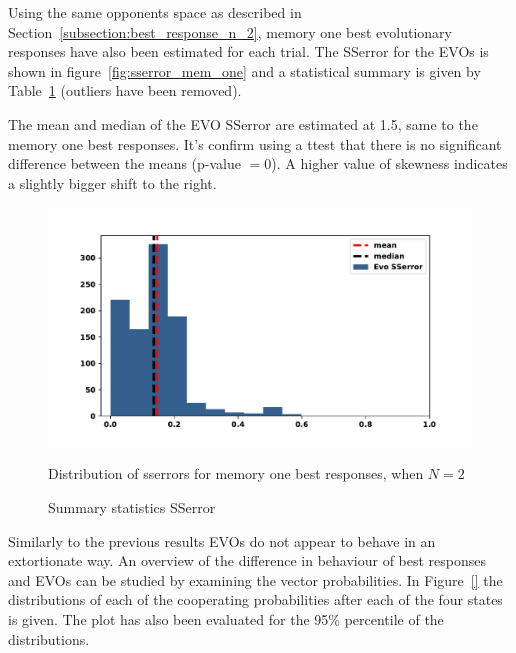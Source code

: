 \documentclass[10pt]{article}
\begin{document}
Using the same opponents space as described in Section~\ref{subsection:best_response_n_2},
memory one best evolutionary responses have also been estimated for each trial.
The SSerror for the EVOs is shown in figure~\ref{fig:sserror_mem_one} and
a statistical summary is given by Table~\ref{table:sserror_stats} (outliers have been
removed).

The mean and median of the EVO SSerror are estimated at 1.5, same to the memory
one best responses. It's confirm using a t\-test that there is no significant
difference between the means (p-value \(=0\)). A higher value of skewness
indicates a slightly bigger shift to the right.

\begin{figure}
    \begin{minipage}{0.59\textwidth}
            \begin{center}
            \includegraphics[width=\linewidth]{img/evo_sserror_remove_outliers.pdf}
            \end{center}
            \caption{Distribution of sserrors for memory one best responses, when \(N=2\)}
            \label{fig:sserror_mem_one}
    \end{minipage}
    \hfill
    \begin{minipage}{0.39\textwidth}
        \centering
        \captionsetup{type=table}
        \resizebox{.41\columnwidth}{!}{%
            }
            \caption{Summary statistics SSerror}
            \label{table:sserror_stats}
      \end{minipage}
\end{figure}

Similarly to the previous results EVOs do not appear to behave in an extortionate
way. An overview of the difference in behaviour of best responses and EVOs
can be studied by examining the vector probabilities. In Figure~\ref{} the
distributions of each of the cooperating probabilities after each of the four
states is given. The plot has also been evaluated for the 95\% percentile
of the distributions.
\end{document}
